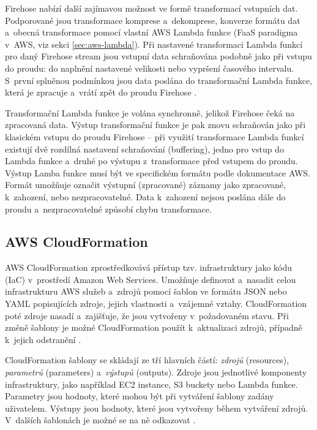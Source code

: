 \documentclass[czech, ing, kiv, he, iso690]{fasthesis}
\begin{document}
Firehose nabízí další zajímavou možnost ve formě transformací vstupních dat. Podporované jsou transformace komprese a~dekomprese, konverze formátu dat a~obecná transformace pomocí vlastní AWS Lambda funkce (FaaS paradigma v~AWS, viz sekci \ref{sec:aws-lambda}). Při nastavené transformaci Lambda funkcí pro daný Firehose stream jsou vstupní data schraňována podobně jako při vstupu do proudu: do naplnění nastavené velikosti nebo vypršení časového intervalu. S~první splněnou podmínkou jsou data poslána do transformační Lambda funkce, která je zpracuje a~vrátí zpět do proudu Firehose \cite{firehose.docs.aws}. 

Transformační Lambda funkce je volána synchronně, jelikož Firehose čeká na zpracovaná data. Výstup transformační funkce je pak znovu schraňován jako při klasickém vstupu do proudu Firehose \cite{firehose.docs.aws} -- při využití transformace Lambda funkcí existují dvě rozdílná nastavení schraňování (buffering), jedno pro vstup do Lambda funkce a~druhé po výstupu z~transformace před vstupem do proudu. Výstup Lamba funkce musí být ve specifickém formátu podle dokumentace AWS. Formát umožňuje označit výstupní (zpracované) záznamy jako zpracované, k~zahození, nebo nezpracovatelné. Data k~zahození nejsou poslána dále do proudu a~nezpracovatelné způsobí chybu transformace.


\subsection{AWS CloudFormation}
AWS CloudFormation zprostředkovává přístup tzv. infrastruktury jako kódu (IaC) v~prostředí Amazon Web Services. Umožňuje definovat a~nasadit celou infrastrukturu AWS služeb a~zdrojů pomocí šablon ve formátu JSON nebo YAML popisujících zdroje, jejich vlastnosti a~vzájemné vztahy. CloudFormation poté zdroje nasadí a~zajišťuje, že jsou vytvořeny v~požadovaném stavu. Při změně šablony je možné CloudFormation použít k~aktualizaci zdrojů, případně k~jejich odstranění \cite{cloudformation.docs.aws}.

CloudFormation šablony se skládají ze tří hlavních částí: \emph{zdrojů} (resources), \emph{parametrů} (parameters) a~\emph{výstupů} (outputs). Zdroje jsou jednotlivé komponenty infrastruktury, jako například EC2 instance, S3 buckety nebo Lambda funkce. Parametry jsou hodnoty, které mohou být při vytváření šablony zadány uživatelem. Výstupy jsou hodnoty, které jsou vytvořeny během vytváření zdrojů. V~dalších šablonách je možné se na ně odkazovat \cite{cloudformation.docs.aws}.
\end{document}
